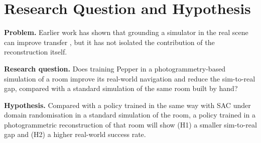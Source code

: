 \section{Research Question and Hypothesis}\label{sec:rq}
\textbf{Problem.} Earlier work has shown that grounding a simulator in the real scene can improve
transfer \cite{liu2020rsr, chhablani2025embodiedsplat}, but it has not isolated the contribution
of the reconstruction itself.

\textbf{Research question.} Does training Pepper in a photogrammetry-based simulation of a room
improve its real-world navigation and reduce the sim-to-real gap, compared with a standard
simulation of the same room built by hand?

\textbf{Hypothesis.} Compared with a policy trained in the same way with SAC under domain
randomisation in a standard simulation of the room, a policy trained in a photogrammetric
reconstruction of that room will show (H1) a smaller sim-to-real gap and (H2) a higher
real-world success rate.
